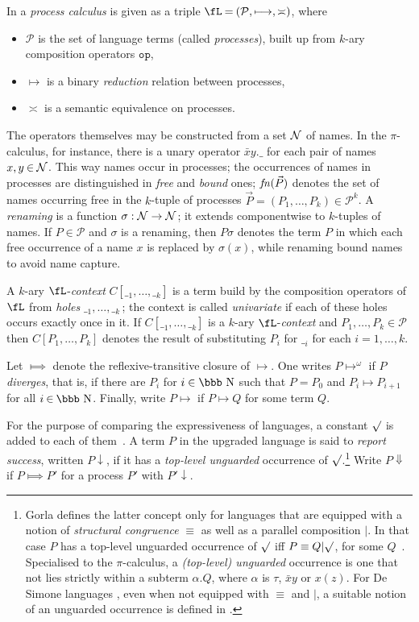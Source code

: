 \documentclass[runningheads]{llncs}
\newcommand{\N} {{\cal N}}               %
\newcommand{\fn}{{\it fn}}               %
\newcommand{\op}{\mathtt{op}}
\begin{document}
\noindent
In \cite{Gorla10a} a \emph{process calculus} is given as a triple
$\fL\mathbin=(\mathcal{P},\longmapsto,\asymp)$, where
\begin{itemize}
\item $\mathcal{P}$ is the set of language terms (called
  \emph{processes}), built up from $k$-ary composition operators $\op$,\pagebreak[3]
\item $\longmapsto$ is a binary \emph{reduction} relation between
  processes,
\item $\asymp$ is a semantic equivalence on processes.
\end{itemize}
The operators themselves may be constructed from a set $\N$
of names. In the $\pi$-calculus, for instance, there is a unary
operator $\bar x y.\_$ for each pair of names
\mbox{$x,y\mathbin\in\N$}.
This way names occur in processes; the occurrences of names in
processes are distinguished in \emph{free} and \emph{bound} ones;
$\fn(\vec P)$ denotes the set of names occurring free in the $k$-tuple
of processes $\vec P=(P_1,\dots,P_k)\mathbin\in\mathcal{P}^k$.
A \emph{renaming} is a function $\sigma:\N\rightarrow\N$;
it extends componentwise to $k$-tuples of names.
If $P\mathbin\in\mathcal{P}$ and $\sigma$ is a renaming, then $P\sigma$
denotes the term $P$ in which each free occurrence of a name $x$ is
replaced by $\sigma(x)$, while renaming bound names to avoid name capture.

A $k$-ary $\fL$-\emph{context} $C[\__1,\dots,\__k]$ is a term
build by the composition operators of $\fL$ from \emph{holes}
$\__1,\dots,\__k$\,; the context is called \emph{univariate}
if each of these holes occurs exactly once in it.
If $C[\__1,\dots,\__k]$ is a $k$-ary $\fL$-\emph{context} and
$P_1,\dots,P_k \in \mathcal{P}$ then $C[P_1,\dots,P_k]$ denotes the
result of substituting $P_i$ for $\__i$ for each $i\mathbin=1,\dots,k$.

Let $\Longmapsto$ denote the reflexive-transitive closure of $\longmapsto$.
One writes $P\longmapsto^\omega$ if $P$ \emph{diverges}, that is, if
there are $P_i$ for $i\in\mbox{\bbb N}$ such that $P\mathbin= P_0$ and
$P_i\longmapsto P_{i+1}$ for all $i\mathbin\in\mbox{\bbb N}$.
Finally, write $P\longmapsto$ if $P\longmapsto Q$ for some term $Q$.

For the purpose of comparing the expressiveness of languages,
a constant $\surd$ is added to each of them~\cite{Gorla10a}.
A term $P$ in the upgraded language is said to \emph{report success},
written $P{\downarrow}$, if it has a \emph{top-level unguarded} occurrence
of $\surd$.\footnote{Gorla defines the latter concept only for languages
  that are equipped with a notion of \emph{structural congruence} $\equiv$ as well as a parallel
  composition $|$. In that case
  $P$ has a top-level unguarded occurrence of $\surd$ iff $P\equiv Q|\surd$, for some $Q$~\cite{Gorla10a}.
  Specialised to the $\pi$-calculus, a \emph{(top-level) unguarded} occurrence is one that not lies
  strictly within a subterm $\alpha.Q$, where $\alpha$ is $\tau$, $\bar xy$ or $x(z)$.
  For De Simone languages \cite{dS85}, even when not equipped with $\equiv$ and $|$, a suitable
  notion of an unguarded occurrence is defined in \cite{Va93copy}.}
Write $P{\Downarrow}$ if $P\Longmapsto P'$ for a process $P'$ with $P'{\downarrow}$.
\end{document}
